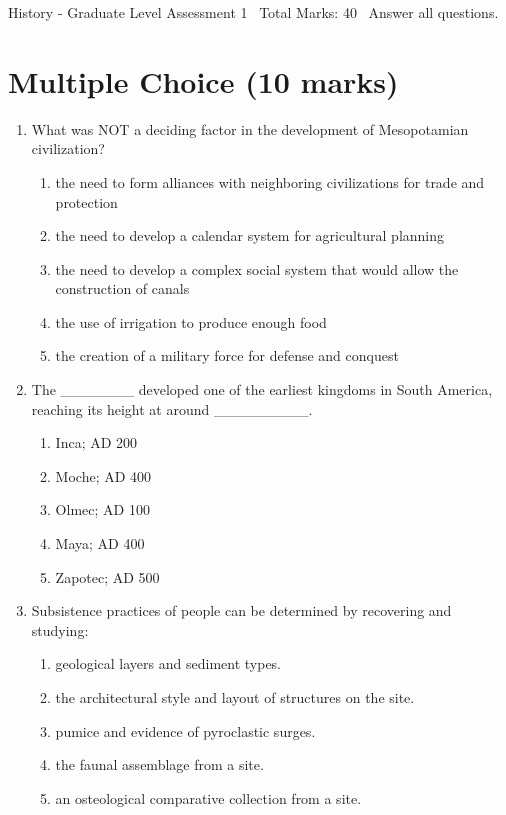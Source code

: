 \documentclass[12pt]{article}
\begin{document}
\begin{center}
History - Graduate Level Assessment 1 \
Total Marks: 40 \
Answer all questions.
\end{center}

\section*{Multiple Choice (10 marks)}
\begin{enumerate}[label=\arabic*.]
\item What was NOT a deciding factor in the development of Mesopotamian civilization?
\begin{enumerate}[label=(\alph*)]
    \item the need to form alliances with neighboring civilizations for trade and protection
    \item the need to develop a calendar system for agricultural planning
    \item the need to develop a complex social system that would allow the construction of canals
    \item the use of irrigation to produce enough food
    \item the creation of a military force for defense and conquest
\end{enumerate}
\item The \_\_\_\_\_\_\_ developed one of the earliest kingdoms in South America, reaching its height
at around \_\_\_\_\_\_\_\_\_.
\begin{enumerate}[label=(\alph*)]
    \item Inca; AD 200
    \item Moche; AD 400
    \item Olmec; AD 100
    \item Maya; AD 400
    \item Zapotec; AD 500
\end{enumerate}
\item Subsistence practices of people can be determined by recovering and studying:
\begin{enumerate}[label=(\alph*)]
    \item geological layers and sediment types.
    \item the architectural style and layout of structures on the site.
    \item pumice and evidence of pyroclastic surges.
    \item the faunal assemblage from a site.
    \item an osteological comparative collection from a site.

\end{enumerate}
\end{enumerate}
\end{document}
